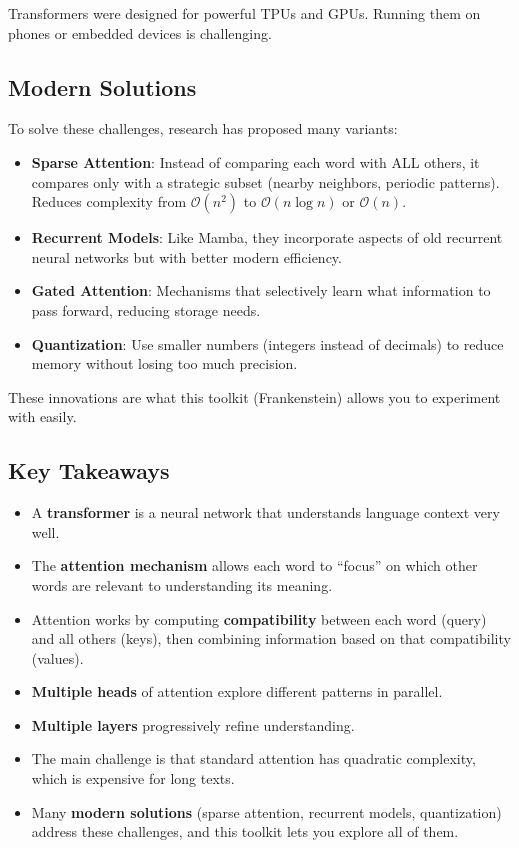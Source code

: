 \documentclass[11pt,a4paper]{article}
\begin{document}
Transformers were designed for powerful TPUs and GPUs. Running them on phones or embedded devices is challenging.

\subsection{Modern Solutions}

To solve these challenges, research has proposed many variants:

\begin{itemize}[leftmargin=*]
    \item \textbf{Sparse Attention}: Instead of comparing each word with ALL others, it compares only with a strategic subset (nearby neighbors, periodic patterns). Reduces complexity from $\mathcal{O}(n^2)$ to $\mathcal{O}(n \log n)$ or $\mathcal{O}(n)$.
    \item \textbf{Recurrent Models}: Like Mamba, they incorporate aspects of old recurrent neural networks but with better modern efficiency.
    \item \textbf{Gated Attention}: Mechanisms that selectively learn what information to pass forward, reducing storage needs.
    \item \textbf{Quantization}: Use smaller numbers (integers instead of decimals) to reduce memory without losing too much precision.
\end{itemize}

These innovations are what this toolkit (Frankenstein) allows you to experiment with easily.

\subsection{Key Takeaways}

\begin{itemize}[leftmargin=*]
    \item A \textbf{transformer} is a neural network that understands language context very well.
    \item The \textbf{attention mechanism} allows each word to ``focus'' on which other words are relevant to understanding its meaning.
    \item Attention works by computing \textbf{compatibility} between each word (query) and all others (keys), then combining information based on that compatibility (values).
    \item \textbf{Multiple heads} of attention explore different patterns in parallel.
    \item \textbf{Multiple layers} progressively refine understanding.
    \item The main challenge is that standard attention has quadratic complexity, which is expensive for long texts.
    \item Many \textbf{modern solutions} (sparse attention, recurrent models, quantization) address these challenges, and this toolkit lets you explore all of them.
\end{itemize}
\end{document}

